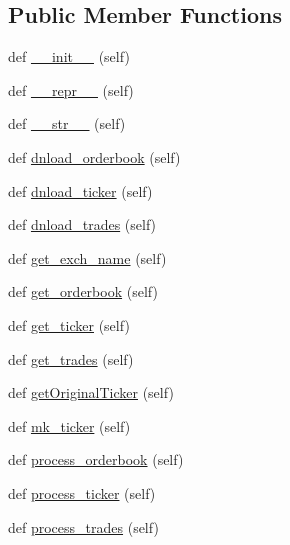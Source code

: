 \subsection*{Public Member Functions}
\begin{DoxyCompactItemize}
\item 
def \hyperlink{classexchange_1_1_exchange_adc6345bd84ea113d46f4e044dbd4d0fb}{\+\_\+\+\_\+init\+\_\+\+\_\+} (self)
\item 
def \hyperlink{classexchange_1_1_exchange_afff4d01a82947f2e3be0d4fa5e0e0fe7}{\+\_\+\+\_\+repr\+\_\+\+\_\+} (self)
\item 
def \hyperlink{classexchange_1_1_exchange_ae3fd515a25ead8667f917230b0975a98}{\+\_\+\+\_\+str\+\_\+\+\_\+} (self)
\item 
def \hyperlink{classexchange_1_1_exchange_a99f32c746467a00b455a97c7805fd710}{dnload\+\_\+orderbook} (self)
\item 
def \hyperlink{classexchange_1_1_exchange_a9e700d31fd60de495956518436b6768a}{dnload\+\_\+ticker} (self)
\item 
def \hyperlink{classexchange_1_1_exchange_a202c8b57ffa0adcb830de89d6466fd60}{dnload\+\_\+trades} (self)
\item 
def \hyperlink{classexchange_1_1_exchange_a8f095bac98d7ad212f93bfcdff458bf7}{get\+\_\+exch\+\_\+name} (self)
\item 
def \hyperlink{classexchange_1_1_exchange_a5d0c05c289d664892ade5edb03adbd6b}{get\+\_\+orderbook} (self)
\item 
def \hyperlink{classexchange_1_1_exchange_aabe7d5679cac0096bc54169cfceea536}{get\+\_\+ticker} (self)
\item 
def \hyperlink{classexchange_1_1_exchange_a254bac1703de55674f5ebfbb03a95e74}{get\+\_\+trades} (self)
\item 
def \hyperlink{classexchange_1_1_exchange_a6925ebc9654ca9120d70fd0105399dc3}{get\+Original\+Ticker} (self)
\item 
def \hyperlink{classexchange_1_1_exchange_a31c0527e3a8a21fe74f9c24a79a86e6b}{mk\+\_\+ticker} (self)
\item 
def \hyperlink{classexchange_1_1_exchange_a93c60cd18eab808d68191fb1d2d42cf8}{process\+\_\+orderbook} (self)
\item 
def \hyperlink{classexchange_1_1_exchange_aa3f83a45154aa4a1b07010f74c2b37db}{process\+\_\+ticker} (self)
\item 
def \hyperlink{classexchange_1_1_exchange_a0e67454c7053807302be914376790484}{process\+\_\+trades} (self)
\end{DoxyCompactItemize}
